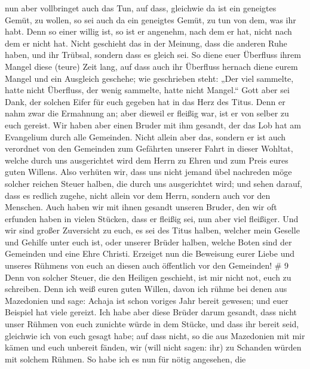  nun aber vollbringet auch das Tun, auf dass, gleichwie da
ist ein geneigtes Gemüt, zu wollen, so sei auch da ein geneigtes Gemüt,
zu tun von dem, was ihr habt.  Denn so einer willig ist, so
ist er angenehm, nach dem er hat, nicht nach dem er nicht hat.
 Nicht geschieht das in der Meinung, dass die anderen Ruhe
haben, und ihr Trübsal, sondern dass es gleich sei.  So
diene euer Überfluss ihrem Mangel diese (teure) Zeit lang, auf dass auch
ihr Überfluss hernach diene eurem Mangel und ein Ausgleich geschehe;
 wie geschrieben steht: „Der viel sammelte, hatte nicht
Überfluss, der wenig sammelte, hatte nicht Mangel.``  Gott
aber sei Dank, der solchen Eifer für euch gegeben hat in das Herz des
Titus.  Denn er nahm zwar die Ermahnung an; aber dieweil er
fleißig war, ist er von selber zu euch gereist.  Wir haben
aber einen Bruder mit ihm gesandt, der das Lob hat am Evangelium durch
alle Gemeinden.  Nicht allein aber das, sondern er ist auch
verordnet von den Gemeinden zum Gefährten unserer Fahrt in dieser
Wohltat, welche durch uns ausgerichtet wird dem Herrn zu Ehren und zum
Preis eures guten Willens.  Also verhüten wir, dass uns
nicht jemand übel nachreden möge solcher reichen Steuer halben, die
durch uns ausgerichtet wird;  und sehen darauf, dass es
redlich zugehe, nicht allein vor dem Herrn, sondern auch vor den
Menschen.  Auch haben wir mit ihnen gesandt unseren Bruder,
den wir oft erfunden haben in vielen Stücken, dass er fleißig sei, nun
aber viel fleißiger.  Und wir sind großer Zuversicht zu
euch, es sei des Titus halben, welcher mein Geselle und Gehilfe unter
euch ist, oder unserer Brüder halben, welche Boten sind der Gemeinden
und eine Ehre Christi.  Erzeiget nun die Beweisung eurer
Liebe und unseres Rühmens von euch an diesen auch öffentlich vor den
Gemeinden! \# 9  Denn von solcher Steuer, die den Heiligen
geschieht, ist mir nicht not, euch zu schreiben.  Denn ich
weiß euren guten Willen, davon ich rühme bei denen aus Mazedonien und
sage: Achaja ist schon voriges Jahr bereit gewesen; und euer Beispiel
hat viele gereizt.  Ich habe aber diese Brüder darum
gesandt, dass nicht unser Rühmen von euch zunichte würde in dem Stücke,
und dass ihr bereit seid, gleichwie ich von euch gesagt habe;
 auf dass nicht, so die aus Mazedonien mit mir kämen und
euch unbereit fänden, wir (will nicht sagen: ihr) zu Schanden würden mit
solchem Rühmen.  So habe ich es nun für nötig angesehen, die
